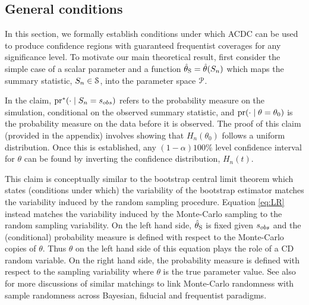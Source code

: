 \subsection{General conditions}\label{sec:main} 
In this section, we formally establish conditions under which ACDC %
can be used to produce confidence regions with guaranteed frequentist coverages for any significance level. To motivate our main theoretical result, first consider the simple case of a scalar parameter and a function $\htheta = \hat{\theta}(S_n)$ which maps the summary statistic, $S_n \in {\cal{S}}$, into the parameter space $\cal{P}$. 
	

In the claim, $\text{\rm pr}^*(\cdot \mid S_n = s_{\rm obs}) $ refers to the probability measure on the simulation, conditional on the observed summary statistic, and $\text{\rm pr}(\cdot \mid \theta = \theta_{0})$ is the probability measure on the data before it is observed.
The proof of this claim (provided in the appendix) involves showing that $H_n(\theta_0)$ follows a uniform distribution. Once this is established, any $(1-\alpha)100\%$ level confidence interval for $\theta$ can be found by inverting the confidence distribution, $H_n(t)$. 
 
This claim is conceptually similar to the bootstrap central limit theorem which states (conditions under which) the variability of the bootstrap estimator matches the variability induced by the random sampling procedure. Equation \eqref{eq:LR} instead matches the variability induced by the Monte-Carlo sampling  %
to the random sampling variability. 
On the left hand side, $\htheta$ is fixed given $s_{\rm obs}$ and the (conditional) probability measure is defined with respect to the Monte-Carlo copies of $\theta$. Thus $\theta$ on the left hand side of this equation plays the role of a CD random variable. On the right hand side, the probability measure is defined with respect to the sampling variability where $\theta$ is the true parameter value. See also  \cite{Thornton2022} for more discussions of similar matchings to link Monte-Carlo randomness with sample randomness across Bayesian, fiducial and frequentist paradigms. 


